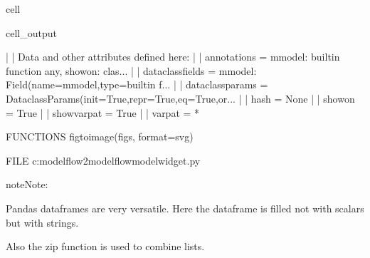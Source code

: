 \documentclass[letterpaper,10pt,english]{jupyterBook}
\begin{document}
\begin{sphinxuseclass}{cell}
\begin{sphinxVerbatimOutput}
\begin{sphinxuseclass}{cell_output}
\begin{sphinxVerbatim}[commandchars=\\\{\}]
     |  \PYGZhy{}\PYGZhy{}\PYGZhy{}\PYGZhy{}\PYGZhy{}\PYGZhy{}\PYGZhy{}\PYGZhy{}\PYGZhy{}\PYGZhy{}\PYGZhy{}\PYGZhy{}\PYGZhy{}\PYGZhy{}\PYGZhy{}\PYGZhy{}\PYGZhy{}\PYGZhy{}\PYGZhy{}\PYGZhy{}\PYGZhy{}\PYGZhy{}\PYGZhy{}\PYGZhy{}\PYGZhy{}\PYGZhy{}\PYGZhy{}\PYGZhy{}\PYGZhy{}\PYGZhy{}\PYGZhy{}\PYGZhy{}\PYGZhy{}\PYGZhy{}\PYGZhy{}\PYGZhy{}\PYGZhy{}\PYGZhy{}\PYGZhy{}\PYGZhy{}\PYGZhy{}\PYGZhy{}\PYGZhy{}\PYGZhy{}\PYGZhy{}\PYGZhy{}\PYGZhy{}\PYGZhy{}\PYGZhy{}\PYGZhy{}\PYGZhy{}\PYGZhy{}\PYGZhy{}\PYGZhy{}\PYGZhy{}\PYGZhy{}\PYGZhy{}\PYGZhy{}\PYGZhy{}\PYGZhy{}\PYGZhy{}\PYGZhy{}\PYGZhy{}\PYGZhy{}\PYGZhy{}\PYGZhy{}\PYGZhy{}\PYGZhy{}\PYGZhy{}\PYGZhy{}
     |  Data and other attributes defined here:
     |  
     |  \PYGZus{}\PYGZus{}annotations\PYGZus{}\PYGZus{} = \PYGZob{}\PYGZsq{}mmodel\PYGZsq{}: \PYGZlt{}built\PYGZhy{}in function any\PYGZgt{}, \PYGZsq{}show\PYGZus{}on\PYGZsq{}: \PYGZlt{}clas...
     |  
     |  \PYGZus{}\PYGZus{}dataclass\PYGZus{}fields\PYGZus{}\PYGZus{} = \PYGZob{}\PYGZsq{}mmodel\PYGZsq{}: Field(name=\PYGZsq{}mmodel\PYGZsq{},type=\PYGZlt{}built\PYGZhy{}in f...
     |  
     |  \PYGZus{}\PYGZus{}dataclass\PYGZus{}params\PYGZus{}\PYGZus{} = \PYGZus{}DataclassParams(init=True,repr=True,eq=True,or...
     |  
     |  \PYGZus{}\PYGZus{}hash\PYGZus{}\PYGZus{} = None
     |  
     |  show\PYGZus{}on = True
     |  
     |  showvarpat = True
     |  
     |  varpat = \PYGZsq{}*\PYGZsq{}

FUNCTIONS
    fig\PYGZus{}to\PYGZus{}image(figs, format=\PYGZsq{}svg\PYGZsq{})

FILE
    c:\PYGZbs{}modelflow2\PYGZbs{}modelflow\PYGZbs{}modelwidget.py
\end{sphinxVerbatim}

\end{sphinxuseclass}\end{sphinxVerbatimOutput}

\end{sphinxuseclass}
\begin{sphinxadmonition}{note}{Note:}
\sphinxAtStartPar
{}

\sphinxAtStartPar
Pandas dataframes are very versatile. Here the dataframe is filled not with scalars but with strings.

\sphinxAtStartPar
Also the zip function is used to combine lists. 
\end{sphinxadmonition}
\end{document}
